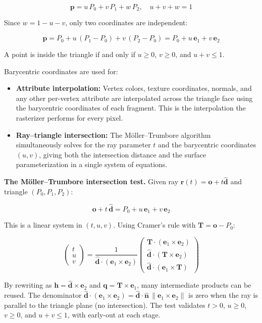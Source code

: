 \documentclass[
  11pt,
  letterpaper,
  DIV=11,
  numbers=noendperiod,
  twoside,
  open=right]{scrreprt}
\providecommand{\tightlist}{%
  \setlength{\itemsep}{0pt}\setlength{\parskip}{0pt}}
\begin{document}
\[
\mathbf{p} = u \, P_0 + v \, P_1 + w \, P_2, \quad u + v + w = 1
\]

Since \(w = 1 - u - v\), only two coordinates are independent:

\[
\mathbf{p} = P_0 + u \, (P_1 - P_0) + v \, (P_2 - P_0) = P_0 + u \, \mathbf{e}_1 + v \, \mathbf{e}_2
\]

A point is inside the triangle if and only if \(u \geq 0\),
\(v \geq 0\), and \(u + v \leq 1\).

Barycentric coordinates are used for:

\begin{itemize}
\tightlist
\item
  \textbf{Attribute interpolation:} Vertex colors, texture coordinates,
  normals, and any other per-vertex attribute are interpolated across
  the triangle face using the barycentric coordinates of each fragment.
  This is the interpolation the rasterizer performs for every pixel.
\item
  \textbf{Ray--triangle intersection:} The Möller--Trumbore algorithm
  simultaneously solves for the ray parameter \(t\) and the barycentric
  coordinates \((u, v)\), giving both the intersection distance and the
  surface parameterization in a single system of equations.
\end{itemize}

\textbf{The Möller--Trumbore intersection test.} Given ray
\(\mathbf{r}(t) = \mathbf{o} + t\hat{\mathbf{d}}\) and triangle
\((P_0, P_1, P_2)\):

\[
\mathbf{o} + t \, \hat{\mathbf{d}} = P_0 + u \, \mathbf{e}_1 + v \, \mathbf{e}_2
\]

This is a linear system in \((t, u, v)\). Using Cramer's rule with
\(\mathbf{T} = \mathbf{o} - P_0\):

\[
\begin{pmatrix} t \\ u \\ v \end{pmatrix}
= \frac{1}{\hat{\mathbf{d}} \cdot (\mathbf{e}_1 \times \mathbf{e}_2)}
\begin{pmatrix}
  \mathbf{T} \cdot (\mathbf{e}_1 \times \mathbf{e}_2) \\
  \hat{\mathbf{d}} \cdot (\mathbf{T} \times \mathbf{e}_2) \\
  \hat{\mathbf{d}} \cdot (\mathbf{e}_1 \times \mathbf{T})
\end{pmatrix}
\]

By rewriting as \(\mathbf{h} = \hat{\mathbf{d}} \times \mathbf{e}_2\)
and \(\mathbf{q} = \mathbf{T} \times \mathbf{e}_1\), many intermediate
products can be reused. The denominator
\(\hat{\mathbf{d}} \cdot (\mathbf{e}_1 \times \mathbf{e}_2) = \hat{\mathbf{d}} \cdot \hat{\mathbf{n}} \, \|\mathbf{e}_1 \times \mathbf{e}_2\|\)
is zero when the ray is parallel to the triangle plane (no
intersection). The test validates \(t > 0\), \(u \geq 0\), \(v \geq 0\),
and \(u + v \leq 1\), with early-out at each stage.
\end{document}
